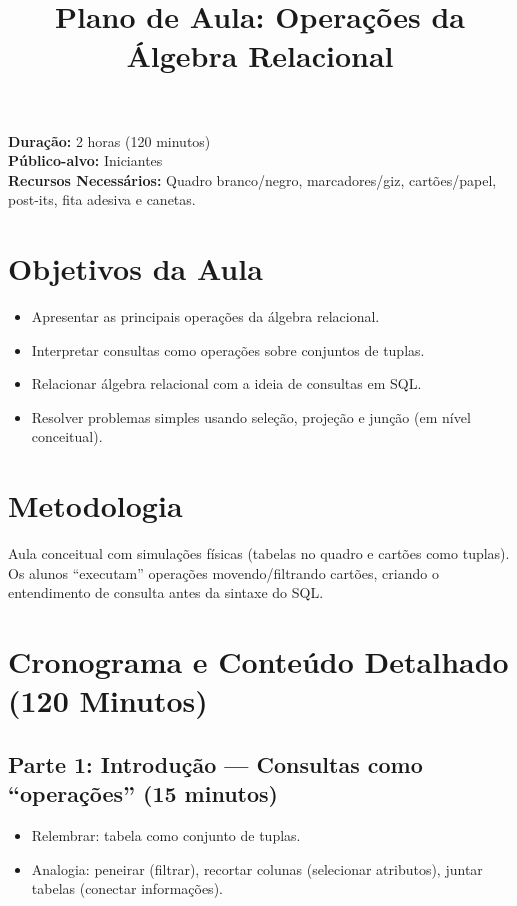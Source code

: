 \documentclass[12pt,a4paper]{article}
\title{Plano de Aula: Operações da Álgebra Relacional}
\date{}
\begin{document}
\maketitle

\noindent
\textbf{Duração:} 2 horas (120 minutos)\\
\textbf{Público-alvo:} Iniciantes\\
\textbf{Recursos Necessários:} Quadro branco/negro, marcadores/giz, cartões/papel, post-its, fita adesiva e canetas.

\section{Objetivos da Aula}
\begin{itemize}[leftmargin=*,itemsep=0.25em]
  \item Apresentar as principais operações da álgebra relacional.
  \item Interpretar consultas como operações sobre conjuntos de tuplas.
  \item Relacionar álgebra relacional com a ideia de consultas em SQL.
  \item Resolver problemas simples usando seleção, projeção e junção (em nível conceitual).
\end{itemize}

\section{Metodologia}
Aula conceitual com simulações físicas (tabelas no quadro e cartões como tuplas). Os alunos ``executam'' operações movendo/filtrando cartões, criando o entendimento de consulta antes da sintaxe do SQL.

\section{Cronograma e Conteúdo Detalhado (120 Minutos)}
\subsection*{Parte 1: Introdução --- Consultas como ``operações'' (15 minutos)}
\begin{itemize}[leftmargin=*,itemsep=0.35em]
  \item Relembrar: tabela como conjunto de tuplas.
  \item Analogia: peneirar (filtrar), recortar colunas (selecionar atributos), juntar tabelas (conectar informações).
\end{itemize}
\end{document}
